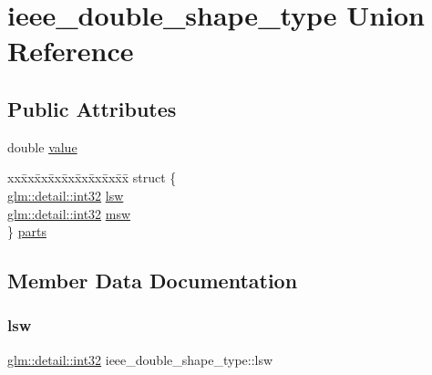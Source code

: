 \hypertarget{unionieee__double__shape__type}{}\section{ieee\+\_\+double\+\_\+shape\+\_\+type Union Reference}
\label{unionieee__double__shape__type}
\subsection*{Public Attributes}
\begin{DoxyCompactItemize}
\item 
double \hyperlink{unionieee__double__shape__type_a2d9c4cab9e3fa74e4be6d72f798a145b}{value}
\item 
\begin{tabbing}
xx\=xx\=xx\=xx\=xx\=xx\=xx\=xx\=xx\=\kill
struct \{\\
\>\hyperlink{namespaceglm_1_1detail_a9f85b4efeca416cdcec2fd08939a2e17}{glm::detail::int32} \hyperlink{unionieee__double__shape__type_a15dfdc2d74a323f6638204624834f101}{lsw}\\
\>\hyperlink{namespaceglm_1_1detail_a9f85b4efeca416cdcec2fd08939a2e17}{glm::detail::int32} \hyperlink{unionieee__double__shape__type_aea1156759f6afd58a56a7b4e7bfcee01}{msw}\\
\} \hyperlink{unionieee__double__shape__type_aac525c7c74b266e1e6e4afd83536665d}{parts}\\

\end{tabbing}\end{DoxyCompactItemize}


\subsection{Member Data Documentation}
\mbox{\label{unionieee__double__shape__type_a15dfdc2d74a323f6638204624834f101}} 
\subsubsection{\texorpdfstring{lsw}{lsw}}
{\footnotesize\ttfamily \hyperlink{namespaceglm_1_1detail_a9f85b4efeca416cdcec2fd08939a2e17}{glm\+::detail\+::int32} ieee\+\_\+double\+\_\+shape\+\_\+type\+::lsw}

